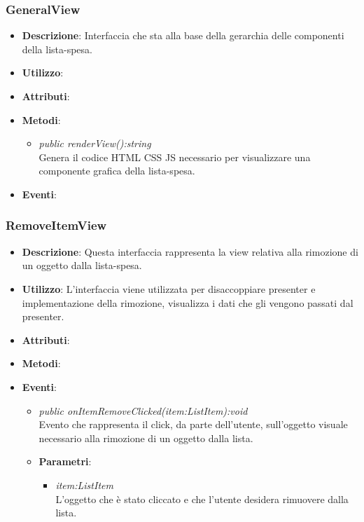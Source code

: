 \subsubsection{GeneralView}
\begin{itemize}
\item \textbf{Descrizione}: Interfaccia che sta alla base della gerarchia delle componenti della lista-spesa.
\item \textbf{Utilizzo}:
\item \textbf{Attributi}: 
\item \textbf{Metodi}:
	\begin{itemize}
	\item \textit{public renderView():string}\\
	Genera il codice HTML CSS JS necessario per visualizzare una componente grafica della lista-spesa.
	\end{itemize}
\item \textbf{Eventi}:
\end{itemize}

\subsubsection{RemoveItemView}
\begin{itemize}
\item \textbf{Descrizione}: Questa interfaccia rappresenta la view relativa alla rimozione di un oggetto dalla lista-spesa.
\item \textbf{Utilizzo}: L'interfaccia viene utilizzata per disaccoppiare presenter e implementazione della rimozione, visualizza i dati che gli vengono passati dal presenter.
\item \textbf{Attributi}: 
\item \textbf{Metodi}:
\item \textbf{Eventi}:
	\begin{itemize}	
	\item \textit{public onItemRemoveClicked(item:ListItem):void}\\
	Evento che rappresenta il click, da parte dell'utente, sull'oggetto visuale necessario alla rimozione di un oggetto dalla lista.
			\item{\textbf{Parametri}: \begin{itemize}
			\item \textit{item:ListItem}\\
			L'oggetto che è stato cliccato e che l'utente desidera rimuovere dalla lista.
			\end{itemize}}
	\end{itemize}
\end{itemize}

